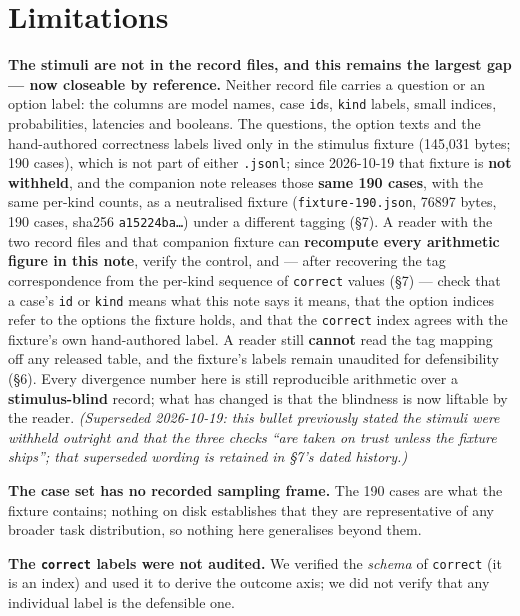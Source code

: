 \documentclass[10pt]{article}
\begin{document}
\section{Limitations}

\textbf{The stimuli are not in the record files, and this remains the largest gap --- now closeable by reference.} Neither record file carries a question or an option label: the columns are model names, case \texttt{id}s, \texttt{kind} labels, small indices, probabilities, latencies and booleans. The questions, the option texts and the hand-authored correctness labels lived only in the stimulus fixture (145,031 bytes; 190 cases), which is not part of either \texttt{.jsonl}; since 2026-10-19 that fixture is \textbf{not withheld}, and the companion note releases those \textbf{same 190 cases}, with the same per-kind counts, as a neutralised fixture (\texttt{fixture-190.json}, 76897 bytes, 190 cases, sha256 \texttt{a15224ba\ldots{}}) under a different tagging (\S7). A reader with the two record files and that companion fixture can \textbf{recompute every arithmetic figure in this note}, verify the control, and --- after recovering the tag correspondence from the per-kind sequence of \texttt{correct} values (\S7) --- check that a case's \texttt{id} or \texttt{kind} means what this note says it means, that the option indices refer to the options the fixture holds, and that the \texttt{correct} index agrees with the fixture's own hand-authored label. A reader still \textbf{cannot} read the tag mapping off any released table, and the fixture's labels remain unaudited for defensibility (\S6). Every divergence number here is still reproducible arithmetic over a \textbf{stimulus-blind} record; what has changed is that the blindness is now liftable by the reader. \emph{(Superseded 2026-10-19: this bullet previously stated the stimuli were withheld outright and that the three checks ``are taken on trust unless the fixture ships''; that superseded wording is retained in \S7's dated history.)}

\textbf{The case set has no recorded sampling frame.} The 190 cases are what the fixture contains; nothing on disk establishes that they are representative of any broader task distribution, so nothing here generalises beyond them.

\textbf{The \texttt{correct} labels were not audited.} We verified the \emph{schema} of \texttt{correct} (it is an index) and used it to derive the outcome axis; we did not verify that any individual label is the defensible one.
\end{document}
